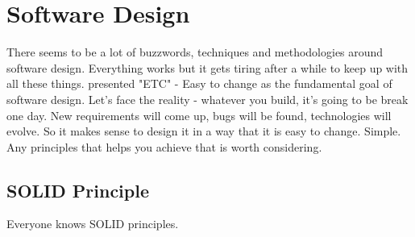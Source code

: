 \section{Software Design}

There seems to be a lot of buzzwords, techniques and methodologies around software design. Everything works but it gets tiring after a while to keep up with all these things. \cite{hunt2000pragmatic} presented "ETC" - Easy to change as the fundamental goal of software design. Let's face the reality - whatever you build, it's going to be break one day. New requirements will come up, bugs will be found, technologies will evolve. So it makes sense to design it in a way that it is easy to change. Simple. Any principles that helps you achieve that is worth considering.

\subsection{SOLID Principle}
Everyone knows SOLID principles.
